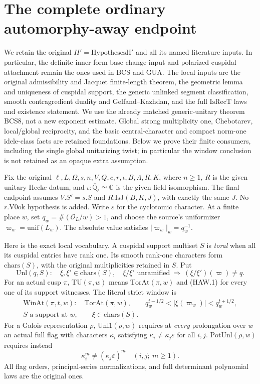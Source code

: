 \section{The complete ordinary automorphy-away endpoint}
\label{sec:automorphy-away-v45}

We retain the original $H'=\mathrm{HypothesesH'}$ and all its
named literature inputs.  In particular, the definite-inner-form
base-change input and polarized cuspidal attachment remain the
ones used in BCS and GUA.  The local inputs are the original
admissibility and Jacquet finite-length theorem, the geometric
lemma and uniqueness of cuspidal support, the generic unlinked
segment classification, smooth contragredient duality and
Gelfand--Kazhdan, and the full $\mathrm{IsRecT}$ laws and existence
statement.  We use the already matched generic-unitary theorem
BCS8, not a new exponent estimate.  Global strong multiplicity one,
Chebotarev, local/global reciprocity, and the basic central-character
and compact norm-one idele-class facts are retained foundations.
Below we prove their finite consumers, including the single global
unitarizing twist; in
particular the window conclusion is not retained as an opaque
extra assumption.

Fix the original $\ell,L,\Omega,s,n,V,Q,c,r,\iota,B,\Lambda,R,K$,
where $n\ge1$, $R$ is the given unitary Hecke datum, and
$\iota:\overline{\mathbb Q}_\ell\simeq\mathbb C$ is the given
field isomorphism.  The final endpoint assumes $V.S'=s.S$ and
$R.\mathrm{IsJ}(B,K,J)$, with exactly the same $J$.  No
$r.\mathrm{V0ok}$ hypothesis is added.  Write $\varepsilon$ for
the cyclotomic character.  At a finite place $w$, set
$q_w=\#(\mathcal O_L/w)>1$, and choose the source's uniformizer
$\varpi_w=\mathrm{unif}(L_w)$.  The absolute value satisfies
$|\varpi_w|_w=q_w^{-1}$.

Here is the exact local vocabulary.  A cuspidal support multiset
$S$ is \emph{toral} when all its cuspidal entries have rank one.
Its smooth rank-one characters form $\mathrm{chars}(S)$, with
the original multiplicities retained in $S$.  Put
\[
 \mathrm{Unl}(q,S):\quad
 \xi,\xi'\in\mathrm{chars}(S),\quad \xi/\xi'\text{ unramified}
       \ \Longrightarrow\ (\xi/\xi')(\varpi)\ne q .
 \tag{HAW.1}
\]
For an actual cusp $\pi$, $\mathrm{TU}(\pi,w)$ means
$\mathrm{TorAt}(\pi,w)$ and (HAW.1) for every one of its
support witnesses.  The literal strict window is
\[
 \begin{gathered}
 \mathrm{WinAt}(\pi,t,w):\quad \mathrm{TorAt}(\pi,w),\qquad
 q_w^{t-1/2}<|\xi(\varpi_w)|<q_w^{t+1/2},\\
 S\text{ a support at }w,\qquad\xi\in\mathrm{chars}(S).
 \end{gathered}
 \tag{HAW.2}
\]
For a Galois representation $\rho$, $\mathrm{Unl1}(\rho,w)$
requires at \emph{every} prolongation over $w$ an actual full flag
with characters $\kappa_i$ satisfying
$\kappa_i\ne\kappa_j\varepsilon$ for all $i,j$.
$\mathrm{PotUnl}(\rho,w)$ requires instead
\[
       \kappa_i^m\ne(\kappa_j\varepsilon)^m
                         \quad(i,j;\ m\ge1).
 \tag{HAW.3}
\]
All flag orders, principal-series normalizations, and full
determinant polynomial laws are the original ones.

